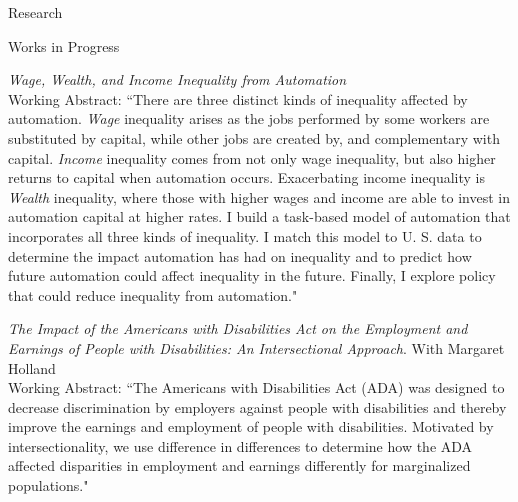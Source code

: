 \documentclass{resume} %
\begin{document}
\begin{rSection}{Research}
    \begin{rSubsection}{Works in Progress}{}{}{}
        \item \emph{Wage, Wealth, and Income Inequality from Automation}\\
        Working Abstract: ``There are three distinct kinds of inequality affected by automation. \emph{Wage} inequality arises as the jobs performed by some workers are substituted by capital, while other jobs are created by, and complementary with capital. \emph{Income} inequality comes from not only wage inequality, but also higher returns to capital when automation occurs. Exacerbating income inequality is \emph{Wealth} inequality, where those with higher wages and income are able to invest in automation capital at higher rates. I build a task-based model of automation that incorporates all three kinds of inequality. I match this model to U. S. data to determine the impact automation has had on inequality and to predict how future automation could affect inequality in the future. Finally, I explore policy that could reduce inequality from automation."
        \item \emph{The Impact of the Americans with Disabilities Act on the Employment and Earnings of People with Disabilities: An Intersectional Approach}. With Margaret Holland\\
        Working Abstract: ``The Americans with Disabilities Act (ADA) was designed to decrease discrimination by employers against people with disabilities and thereby improve the earnings and employment of people with disabilities. Motivated by intersectionality, we use difference in differences to determine how the ADA affected disparities in employment and earnings differently for marginalized populations."
        
    \end{rSubsection}

\end{rSection}
\end{document}
